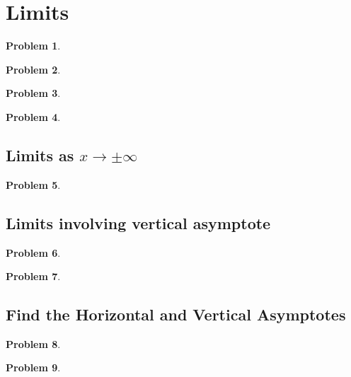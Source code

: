 \documentclass{article}
\newtheorem{problem}{Problem}
\begin{document}
\section{Limits}
\begin{problem}

\end{problem}
\begin{problem}

\end{problem}

\begin{problem}

\end{problem}
\begin{problem}

\end{problem}
\subsection{Limits as $x\to\pm \infty$}
\begin{problem}

\end{problem}

\subsection{Limits involving vertical asymptote}
\begin{problem}

\end{problem}
\begin{problem}

\end{problem}
\subsection{Find the Horizontal and Vertical Asymptotes}
\begin{problem}

\end{problem}


\begin{problem}

\end{problem}
\end{document}
